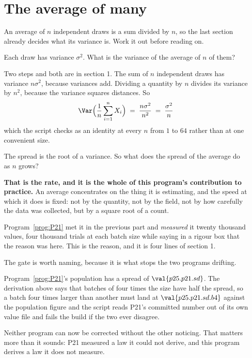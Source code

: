 \section{The average of many}
\label{sec:P25-average}

\begin{fr}
An average of $n$ independent draws is a sum divided by $n$, so the last
section already decides what its variance is. Work it out before reading on.

Each draw has variance $\sigma^{2}$. What is the variance of the average of
$n$ of them?
\dotline
\nextframe
\end{fr}

\begin{fr}

Two steps and both are in section 1. The sum of $n$ independent draws has
variance $n\sigma^{2}$, because variances add. Dividing a quantity by $n$
divides its variance by $n^{2}$, because the variance squares distances. So
\[ \Var\Bigl(\frac{1}{n}\sum_{i=1}^{n} X_i\Bigr)
   \;=\; \frac{n\sigma^{2}}{n^{2}} \;=\; \frac{\sigma^{2}}{n} \]
which the script checks as an identity at every $n$ from $1$ to $64$ rather
than at one convenient size.

The spread is the root of a variance. So what does the spread of the average
do as $n$ grows?
\dotline
\nextframe
\end{fr}

\begin{fr}

\textbf{That is the rate, and it is the whole of this program's contribution
to practice.} An average concentrates on the thing it is estimating, and the
speed at which it does is fixed: not by the quantity, not by the field, not by
how carefully the data was collected, but by a square root of a count.

Program~\ref{prog:P21} met it in the previous part and \emph{measured} it
\dash{}
twenty thousand values, four thousand trials at each batch size \dash{} while
saying in a rigour box that the reason was here. This is the reason, and it is
four lines of section 1.
\end{fr}

\begin{fr}
The gate is worth naming, because it is what stops the two programs drifting.

Program~\ref{prog:P21}'s population has a spread of $\val{p25.p21.sd}$. The
derivation above says that batches of four times the size have half the
spread, so a batch four times larger than another must land at
$\val{p25.p21.sd.b4}$ against the population figure \dash{} and the script
reads P21's committed number out of its own value file and fails the build if
the two ever disagree.

Neither program can now be corrected without the other noticing. That matters
more than it sounds: P21 measured a law it could not derive, and this program
derives a law it does not measure.
\end{fr}

